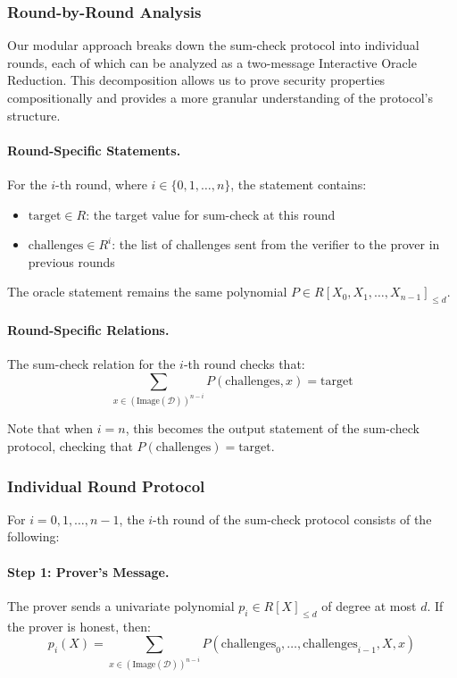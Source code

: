 \subsubsection{Round-by-Round Analysis}

Our modular approach breaks down the sum-check protocol into individual rounds, each of which can be analyzed as a two-message Interactive Oracle Reduction. This decomposition allows us to prove security properties compositionally and provides a more granular understanding of the protocol's structure.

\paragraph{Round-Specific Statements.} For the $i$-th round, where $i \in \{0, 1, \ldots, n\}$, the statement contains:
\begin{itemize}
    \item $\text{target} \in R$: the target value for sum-check at this round
    \item $\text{challenges} \in R^i$: the list of challenges sent from the verifier to the prover in previous rounds
\end{itemize}

The oracle statement remains the same polynomial $P \in R[X_0, X_1, \ldots, X_{n-1}]_{\leq d}$.

\paragraph{Round-Specific Relations.} The sum-check relation for the $i$-th round checks that:
\[
\sum_{x \in (\text{Image}(\mathcal{D}))^{n-i}} P(\text{challenges}, x) = \text{target}
\]

Note that when $i = n$, this becomes the output statement of the sum-check protocol, checking that $P(\text{challenges}) = \text{target}$.

\subsubsection{Individual Round Protocol}

For $i = 0, 1, \ldots, n-1$, the $i$-th round of the sum-check protocol consists of the following:

\paragraph{Step 1: Prover's Message.} The prover sends a univariate polynomial $p_i \in R[X]_{\leq d}$ of degree at most $d$. If the prover is honest, then:
\[
p_i(X) = \sum_{x \in (\text{Image}(\mathcal{D}))^{n-i}} P(\text{challenges}_0, \ldots, \text{challenges}_{i-1}, X, x)
\]

